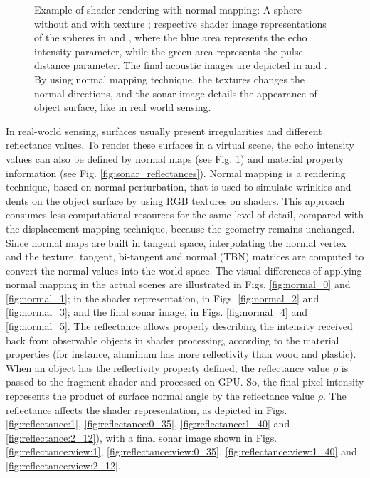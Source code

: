 \documentclass[final,5p,times]{elsarticle}
\begin{document}
\begin{figure}[!ht]
{        \label{fig:normal_5}
    }
    \captionsetup{justification=justified}
    \caption{Example of shader rendering with normal mapping:
    A sphere without  and with texture  ; respective shader image representations of the spheres  in  and , where the blue area represents the echo intensity parameter, while the green area represents the pulse distance parameter. The final acoustic images are depicted in  and . By using normal mapping technique, the textures changes the normal directions, and the sonar image details the appearance of object surface, like in real world sensing.}
    \label{fig:sonar_normal_mapping}
\end{figure}

In real-world sensing, surfaces usually present irregularities
and different reflectance values. To render these surfaces in a virtual scene, the echo intensity values can also be defined by normal maps (see Fig. \ref{fig:sonar_normal_mapping}) and material property information (see Fig. \ref{fig:sonar_reflectances}). Normal mapping is a rendering technique, based on normal perturbation, that is used to simulate wrinkles and dents on the object surface by using RGB textures on shaders. This approach consumes less computational
resources for the same level of detail, compared with the displacement mapping
technique, because the geometry remains unchanged. Since normal maps are built in tangent space, interpolating the normal vertex and the texture, tangent, bi-tangent and normal (TBN) matrices are computed to convert the normal values into the world space. The visual differences of applying normal mapping in the actual scenes are illustrated in Figs. \ref{fig:normal_0} and \ref{fig:normal_1}; in the shader representation, in Figs. \ref{fig:normal_2} and \ref{fig:normal_3}; and the final sonar image, in Figs. \ref{fig:normal_4} and \ref{fig:normal_5}. The reflectance allows properly describing the intensity received back from observable objects in shader processing, according to the material
properties (for instance, aluminum has more reflectivity than wood and plastic).
When an object has the reflectivity property defined, the reflectance value
$\rho$ is passed to the fragment shader and processed on GPU. So, the final pixel intensity represents the product of surface normal angle by the reflectance value $\rho$. The reflectance affects the shader representation, as depicted in Figs. \ref{fig:reflectance:1}, \ref{fig:reflectance:0_35}, \ref{fig:reflectance:1_40} and \ref{fig:reflectance:2_12}), with a final sonar image shown in Figs. \ref{fig:reflectance:view:1}, \ref{fig:reflectance:view:0_35}, \ref{fig:reflectance:view:1_40} and \ref{fig:reflectance:view:2_12}.
\end{document}
